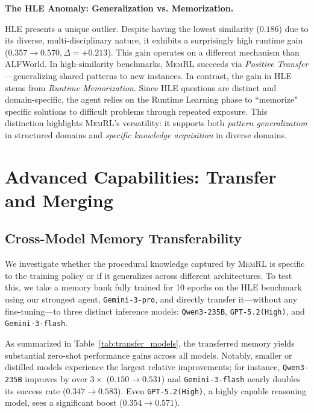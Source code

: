 \documentclass{article}
\theoremstyle{plain}
\theoremstyle{definition}
\theoremstyle{remark}
\begin{document}
\noindent \textbf{The HLE Anomaly: Generalization vs. Memorization.} 

HLE presents a unique outlier. Despite having the lowest similarity ($0.186$) due to its diverse, multi-disciplinary nature, it exhibits a surprisingly high runtime gain ($0.357 \rightarrow 0.570, \Delta=+0.213$).   
This gain operates on a different mechanism than ALFWorld. In high-similarity benchmarks, \textsc{MemRL} succeeds via \textit{Positive Transfer}—generalizing shared patterns to new instances. In contrast, the gain in HLE stems from \textit{Runtime Memorization}. Since HLE questions are distinct and domain-specific, the agent relies on the Runtime Learning phase to ``memorize" specific solutions to difficult problems through repeated exposure. This distinction highlights \textsc{MemRL}'s versatility: it supports both \textit{pattern generalization} in structured domains and \textit{specific knowledge acquisition} in diverse domains.  

\section{Advanced Capabilities: Transfer and Merging}
\label{app:advanced_exp}
\subsection{Cross-Model Memory Transferability}
\label{app:memory_transfer}

We investigate whether the procedural knowledge captured by \textsc{MemRL} is specific to the training policy or if it generalizes across different architectures. To test this, we take a memory bank fully trained for 10 epochs on the HLE benchmark using our strongest agent, \texttt{Gemini-3-pro}, and directly transfer it—without any fine-tuning—to three distinct inference models: \texttt{Qwen3-235B}, \texttt{GPT-5.2(High)}, and \texttt{Gemini-3-flash}.

As summarized in Table~\ref{tab:transfer_models}, the transferred memory yields substantial zero-shot performance gains across all models. Notably, smaller or distilled models experience the largest relative improvements; for instance, \texttt{Qwen3-235B} improves by over $3\times$ ($0.150 \rightarrow 0.531$) and \texttt{Gemini-3-flash} nearly doubles its success rate ($0.347 \rightarrow 0.583$). Even \texttt{GPT-5.2(High)}, a highly capable reasoning model, sees a significant boost ($0.354 \rightarrow 0.571$). 
\end{document}
